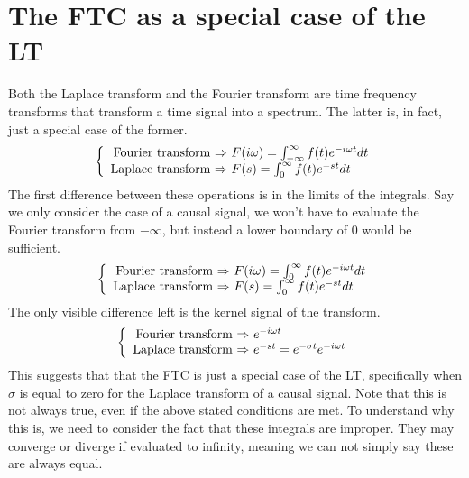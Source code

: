 \documentclass[]{subfiles}
\begin{document}
	\section{The FTC as a special case of the LT}
	Both  the  Laplace  transform  and  the  Fourier  transform  are  time  frequency  transforms that transform a time signal into a spectrum. The latter is, in fact, just a special case of the former. 
		\begin{equation*}
		\left\{ \begin{array}{r@{\text{ $\Rightarrow$ }}l}
			\text{Fourier transform}& F(i\omega)= \int_{-\infty}^{\infty}f(t)e^{-i\omega t}dt \\
			\text{Laplace transform}&F(s)=\int_{0}^{\infty}f(t)e^{-st} dt
		\end{array}\right.
	\end{equation*}
	The first difference between these operations is in the limits of the integrals. Say we only consider the case of a causal signal, we won't have to evaluate the Fourier transform from $-\infty$, but instead a lower boundary  of $0$ would be sufficient. 
			\begin{equation*}
		\left\{ \begin{array}{r@{\text{ $\Rightarrow$ }}l}
			\text{Fourier transform}& F(i\omega)= \int_{0}^{\infty}f(t)e^{-i\omega t}dt \\
			\text{Laplace transform}&F(s)=\int_{0}^{\infty}f(t)e^{-st} dt
		\end{array}\right.
	\end{equation*}
	The only visible difference left is the kernel signal of the transform. 
				\begin{equation*}
		\left\{ \begin{array}{r@{\text{ $\Rightarrow$ }}l}
			\text{Fourier transform}& e^{-i\omega t} \\
			\text{Laplace transform}&e^{-st} = e^{-\sigma t} e^{-i\omega t}
		\end{array}\right.
	\end{equation*}
	This suggests that that the FTC is just a special case of the LT, specifically when $\sigma$ is equal to zero for the Laplace transform of a causal signal. Note that this is not always true, even if the above stated conditions are met. To understand why this is, we need to consider the fact that these integrals are improper. They may converge or diverge if evaluated to infinity, meaning we can not simply say these are always equal.
\end{document}

